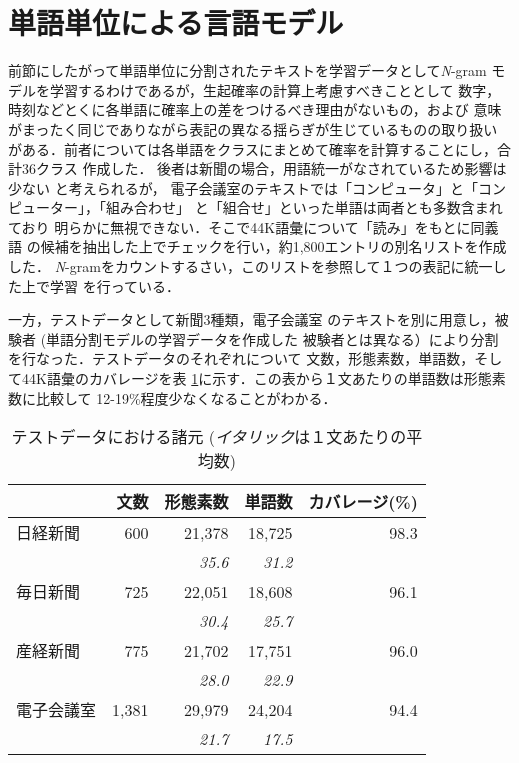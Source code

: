 \section{単語単位による言語モデル}
  前節にしたがって単語単位に分割されたテキストを学習データとして{\it N}-gram
モデルを学習するわけであるが，生起確率の計算上考慮すべきこととして
数字，時刻などとくに各単語に確率上の差をつけるべき理由がないもの，および
意味がまったく同じでありながら表記の異なる揺らぎが生じているものの取り扱い
がある．前者については各単語をクラスにまとめて確率を計算することにし，合計36クラス
作成した．
後者は新聞の場合，用語統一がなされているため影響は少ない
と考えられるが，
電子会議室のテキストでは「コンピュータ」と「コンピューター」，「組み合わせ」
と「組合せ」といった単語は両者とも多数含まれており
明らかに無視できない．そこで44K語彙について「読み」をもとに同義語
の候補を抽出した上でチェックを行い，約1,800エントリの別名リストを作成した．
{\it N}-gramをカウントするさい，このリストを参照して１つの表記に統一した上で学習
を行っている．
\par
一方，テストデータとして新聞3種類，電子会議室
のテキストを別に用意し，被験者 (単語分割モデルの学習データを作成した
\mbox{被験者とは異なる）により分割を行なった．テストデータ}のそれぞれについて
文数，形態素数，単語数，そして44K語彙のカバレージを表
\ref{TBL:TESTDATA}に示す．この表から１文あたりの単語数は形態素数に比較して
12-19\%程度少なくなることがわかる．
\begin{table}[t]
\begin{center}
\caption{テストデータにおける諸元 ({\it イタリック}は１文あたりの平均数)}
\label{TBL:TESTDATA}
\begin{tabular}{lrrrr} \hline
                       &   文数  &  形態素数 & 単語数      &  カバレージ(\%) \\\hline
  日経新聞             &   600   &  21,378   & 18,725      &   98.3          \\
                       &         &{\it 35.6} & {\it 31.2}  &   \\
  毎日新聞	       &   725   &  22,051   & 18,608      &   96.1          \\
		       &         &{\it 30.4} & {\it 25.7}  &   \\
  産経新聞             &   775   &  21,702   & 17,751      &   96.0          \\
                       &         &{\it 28.0} & {\it 22.9}  &   \\
  電子会議室           &   1,381 &  29,979   & 24,204      &   94.4          \\
                       &         &{\it 21.7} & {\it 17.5}  &   \\ \hline
\end{tabular}
\end{center}
\end{table}
